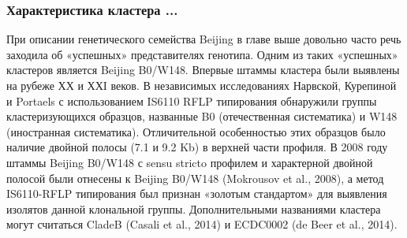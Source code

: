 \subsubsection{Характеристика кластера ...}
При описании генетического семейства Beijing в главе выше довольно часто речь заходила об «успешных» представителях генотипа. Одним из таких «успешных» кластеров является Beijing B0/W148. Впервые штаммы кластера были выявлены на рубеже ХХ и ХХI веков. В независимых исследованиях Нарвской, Курепиной и Portaels с использованием IS6110 RFLP типирования обнаружили группы кластеризующихся образцов, названные B0 (отечественная систематика) и W148 (иностранная систематика). Отличительной особенностью этих образцов было наличие двойной полосы (7.1 и 9.2 Kb) в верхней части профиля. В 2008 году штаммы Beijing B0/W148 с sensu stricto профилем и характерной двойной полосой были отнесены к Beijing B0/W148 (Mokrousov et al., 2008), а метод IS6110-RFLP типирования был признан «золотым стандартом» для выявления изолятов данной клональной группы. Дополнительными названиями кластера могут считаться CladeB (Casali et al., 2014) и ECDC0002 (de Beer et al., 2014).

